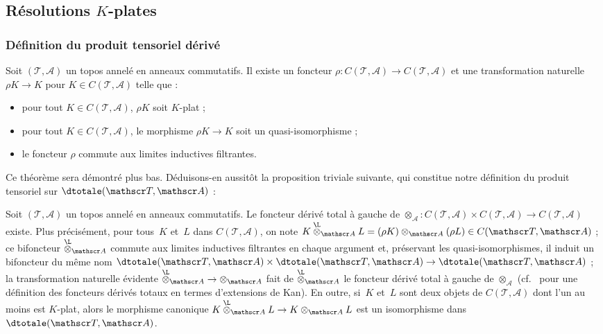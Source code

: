 \documentclass[10pt]{../fichiers-configuration-latex/smfart}
\begin{document}
\subsection{Résolutions \texorpdfstring{$K$-plates}{K-plates}}%
\subsubsection{Définition du produit tensoriel dérivé}%

\begin{theoreme3}\label{17-theoreme-existence-resolutions-k-plates}
Soit $(\mathscr T,\mathscr A)$ un topos annelé en anneaux commutatifs. Il
existe un foncteur $\rho\colon C(\mathscr T,\mathscr A)\to C(\mathscr
T,\mathscr A)$ et une transformation naturelle $\rho K\to K$ pour $K\in
C(\mathscr T,\mathscr A)$ telle que :
\begin{itemize}
\item pour tout $K\in C(\mathscr T,\mathscr A)$, $\rho K$ soit $K$-plat ;
\item pour tout $K\in C(\mathscr T,\mathscr A)$, le morphisme $\rho K\to K$
soit un quasi-isomorphisme ;
\item le foncteur $\rho$ commute aux limites inductives filtrantes.
\end{itemize}
\end{theoreme3}

Ce théorème sera démontré plus bas. Déduisons-en aussitôt la proposition
triviale suivante, qui constitue notre définition du produit tensoriel sur
$\dtotale(\mathscr T,\mathscr A)$ :

\begin{proposition3}\label{17-proposition-existence-produit-tensoriel-derive}
Soit $(\mathscr T,\mathscr A)$ un topos annelé en anneaux commutatifs.
Le foncteur dérivé total à gauche de $\otimes_{\mathscr A}\colon C(\mathscr
T,\mathscr A)\times C(\mathscr T,\mathscr A)\to C(\mathscr T,\mathscr A)$
existe. Plus précisément, pour tous $K$ et $L$ dans $C(\mathscr T,\mathscr
A)$, on note $K\overset{\L}\otimes_{\mathscr A} L=(\rho
K)\otimes_{\mathscr A}(\rho L)\in C(\mathscr T,\mathscr A)$ ; ce bifoncteur
$\overset{\L}\otimes_{\mathscr A}$ commute aux limites inductives
filtrantes en chaque argument et, préservant les quasi-isomorphismes, il
induit un bifoncteur du même nom $\dtotale(\mathscr T,\mathscr A)\times
\dtotale(\mathscr
T,\mathscr A)\to \dtotale(\mathscr T,\mathscr A)$ ; la transformation naturelle
évidente $\overset{\L}\otimes_{\mathscr A}\to\otimes_{\mathscr A}$ 
fait de $\overset{\L}\otimes_{\mathscr A}$ le foncteur dérivé total
à gauche de $\otimes_{\mathscr A}$
(cf.~\cite[remark~7.4, Chapter~~II]{SHT@Goerss-Jardine} pour une définition
des foncteurs dérivés totaux en termes d'extensions de Kan). En outre,
si $K$ et $L$ sont deux objets de $C(\mathscr T,\mathscr A)$ dont l'un
au moins est $K$-plat, alors le morphisme canonique
$K\overset{\L}\otimes_{\mathscr A}L\to K\otimes_{\mathscr A}L$ est un
isomorphisme dans $\dtotale(\mathscr T,\mathscr A)$.
\end{proposition3}
\end{document}

